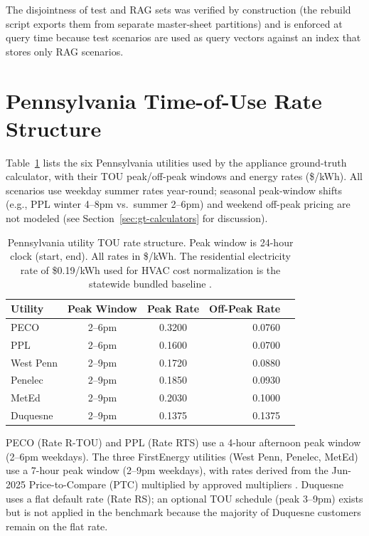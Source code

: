 \documentclass[final,3p,times]{elsarticle}
\begin{document}
The disjointness of test and RAG sets was verified by construction (the
rebuild script exports them from separate master-sheet partitions) and
is enforced at query time because test scenarios are used as query vectors against an index that stores only RAG scenarios.

\section{Pennsylvania Time-of-Use Rate Structure}
\label{app:tou_rates}

Table~\ref{tab:tou_rates} lists the six Pennsylvania utilities used by
the appliance ground-truth calculator, with their TOU peak/off-peak
windows and energy rates (\$/kWh). All scenarios use weekday summer rates
year-round; seasonal peak-window shifts (e.g., PPL winter 4--8pm vs.\
summer 2--6pm) and weekend off-peak pricing are not modeled
(see Section~\ref{sec:gt-calculators} for discussion).

\begin{table}[t]
\small
\centering
\renewcommand{\arraystretch}{1.15}
\caption{Pennsylvania utility TOU rate structure. Peak window is
24-hour clock (start, end). All rates in \$/kWh. The residential
electricity rate of \$0.19/kWh used for HVAC cost normalization is the
statewide bundled baseline \cite{eia_epa_2024,paupc2025}.}
\label{tab:tou_rates}
\begin{tabular}{@{}l cc rr@{}}
\toprule
\textbf{Utility} & \textbf{Peak Window} & \textbf{Peak Rate} &
  \textbf{Off-Peak Rate} \\
\midrule
PECO       & 2--6pm  & 0.3200 & 0.0760 \\
PPL        & 2--6pm  & 0.1600 & 0.0700 \\
West Penn  & 2--9pm  & 0.1720 & 0.0880 \\
Penelec    & 2--9pm  & 0.1850 & 0.0930 \\
MetEd      & 2--9pm  & 0.2030 & 0.1000 \\
Duquesne   & 2--9pm  & 0.1375 & 0.1375 \\
\bottomrule
\end{tabular}
\renewcommand{\arraystretch}{1.0}
\end{table}

PECO (Rate R-TOU) and PPL (Rate RTS) use a 4-hour afternoon peak window
(2--6pm weekdays). The three FirstEnergy utilities (West Penn, Penelec,
MetEd) use a 7-hour peak window (2--9pm weekdays), with rates derived from
the Jun-2025 Price-to-Compare (PTC) multiplied by approved multipliers
\cite{firstenergy2025,firstenergy2026}. Duquesne uses a flat default rate
(Rate RS); an optional TOU schedule (peak 3--9pm) exists but is not
applied in the benchmark because the majority of Duquesne customers remain
on the flat rate.
\end{document}
